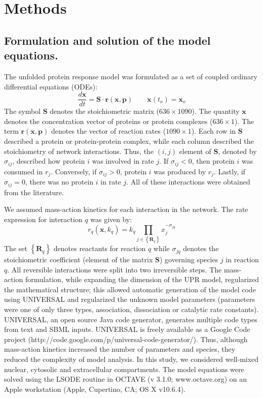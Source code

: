 \documentclass[fleqn,10pt]{wlscirep}
\begin{document}
\section*{Methods}

\subsection*{Formulation and solution of the model equations.}
The unfolded protein response model was formulated as a set of coupled ordinary differential equations (ODEs):
\begin{equation}\label{asseassertain_massbalance}
\frac{d\mathbf{x}}{dt}=\mathbf{S}\cdot\mathbf{r}\left(\mathbf{x},\mathbf{p}\right)\qquad\mathbf{x}\left(t_{o}\right)=\mathbf{x}_{o}
\end{equation}
The symbol $\mathbf{S}$ denotes the stoichiometric matrix ($636\times 1090$). The quantity $\mathbf{x}$ denotes the concentration vector of proteins or protein complexes ($636\times 1$). 
The term $\mathbf{r}\left(\mathbf{x},\mathbf{p}\right)$ denotes the vector of reaction rates ($1090\times{1}$). 
Each row in $\mathbf{S}$ described a protein or protein-protein complex,
while each column described the stoichiometry of network interactions. 
Thus, the $(i,j)$ element of $\mathbf{S}$, denoted by $\sigma_{ij}$, described how protein $i$ was involved in rate $j$. 
If $\sigma_{ij}<0$, then protein $i$ was consumed in $r_j$. Conversely, if $\sigma_{ij}>0$, protein $i$ was
produced by $r_j$. Lastly, if $\sigma_{ij}=0$, there was no protein $i$ in rate $j$. All of these interactions were obtained from the literature. 

We assumed mass-action kinetics for each interaction in the network. 
The rate expression for interaction $q$ was given by:
\begin{equation}\label{eq-mass-action}
r_{q}\left(\mathbf{x},k_{q}\right)=k_{q}\prod_{j\in\left\{\mathbf{R}_{q}\right\}}x_{j}^{-\sigma_{jq}}
\end{equation}
The set $\left\{\mathbf{R}_{q}\right\}$ denotes reactants for reaction $q$ while $\sigma_{jq}$ denotes the stoichiometric coefficient (element of the matrix $\mathbf{S}$) governing species $j$ in reaction $q$. 
All reversible interactions were split into two irreversible steps. The mass-action formulation, while expanding the dimension of the UPR model, 
regularized the mathematical structure; this allowed automatic generation of the model code using UNIVERSAL and regularized the unknown model parameters (parameters were one of only three types, association, dissociation or catalytic rate constants).
UNIVERSAL, an open source Java code generator, generates multiple code types from text and SBML inputs.
UNIVERSAL is freely available as a Google Code project (http://code.google.com/p/universal-code-generator/). 
Thus, although mass-action kinetics increased the number of parameters and species, they reduced the complexity of model analysis. 
In this study, we considered well-mixed nuclear, cytosolic and extracellular compartments. 
The model equations were solved using the LSODE routine in OCTAVE (v 3.1.0; www.octave.org) on an Apple workstation (Apple, Cupertino, CA; OS X v10.6.4). 
\end{document}
